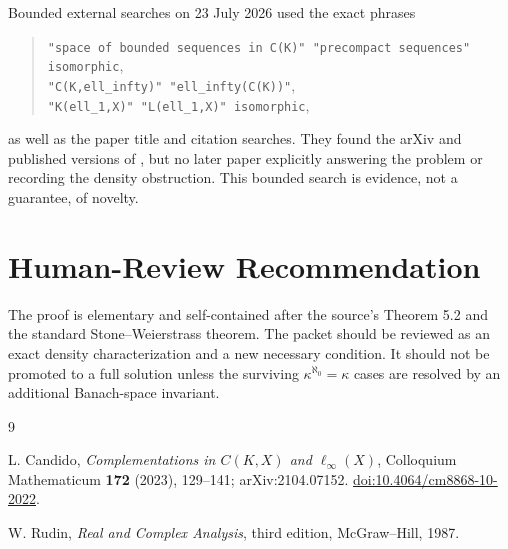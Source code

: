 \documentclass[11pt]{article}
\begin{document}
Bounded external searches on 23 July 2026 used the exact phrases
\begin{quote}
\texttt{"space of bounded sequences in C(K)" "precompact sequences" isomorphic},\\
\texttt{"C(K,ell\_infty)" "ell\_infty(C(K))"},\\
\texttt{"K(ell\_1,X)" "L(ell\_1,X)" isomorphic},
\end{quote}
as well as the paper title and citation searches. They found the arXiv and
published versions of \cite{Candido}, but no later paper explicitly answering
the problem or recording the density obstruction. This bounded search is
evidence, not a guarantee, of novelty.

\section*{Human-Review Recommendation}

The proof is elementary and self-contained after the source's Theorem 5.2 and
the standard Stone--Weierstrass theorem. The packet should be reviewed as an
exact density characterization and a new necessary condition. It should not
be promoted to a full solution unless the surviving
\(\kappa^{\aleph_0}=\kappa\) cases are resolved by an additional Banach-space
invariant.

\begin{thebibliography}{9}

L. Candido,
\emph{Complementations in \(C(K,X)\) and \(\ell_\infty(X)\)},
Colloquium Mathematicum \textbf{172} (2023), 129--141;
arXiv:2104.07152.
\href{https://doi.org/10.4064/cm8868-10-2022}
{doi:10.4064/cm8868-10-2022}.

W. Rudin,
\emph{Real and Complex Analysis}, third edition,
McGraw--Hill, 1987.

\end{thebibliography}
\end{document}
